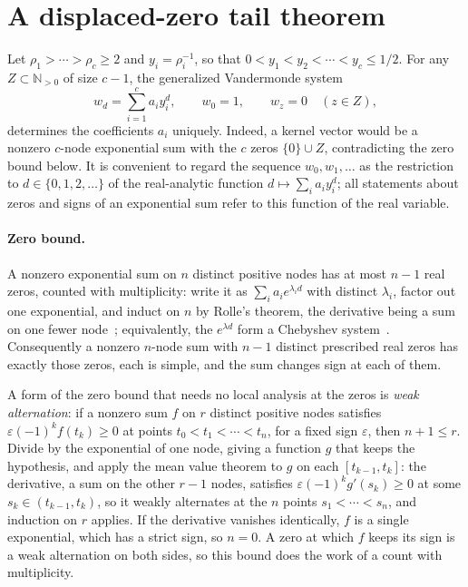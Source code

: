 \documentclass[11pt]{article}
\newcommand{\N}{\mathbb N}
\begin{document}
\section{A displaced-zero tail theorem}

Let $\rho_1>\cdots>\rho_c\ge2$ and $y_i=\rho_i^{-1}$, so that
$0<y_1<y_2<\cdots<y_c\le1/2$.  For any $Z\subset\N_{>0}$ of size $c-1$, the
generalized Vandermonde system
\[
  w_d=\sum_{i=1}^c a_i y_i^d,
  \qquad w_0=1,
  \qquad w_z=0\quad(z\in Z),
\]
determines the coefficients $a_i$ uniquely.  Indeed, a kernel vector would be
a nonzero $c$-node exponential sum with the $c$ zeros $\{0\}\cup Z$,
contradicting the zero bound below.  It is convenient to regard the sequence
$w_0,w_1,\ldots$ as the restriction to $d\in\{0,1,2,\ldots\}$ of the
real-analytic function $d\mapsto\sum_ia_iy_i^d$; all statements about zeros
and signs of an exponential sum refer to this function of the real variable.

\paragraph{Zero bound.}
A nonzero exponential sum on $n$ distinct positive nodes has at most $n-1$
real zeros, counted with multiplicity: write it as $\sum_ia_ie^{\lambda_id}$
with distinct $\lambda_i$, factor out one exponential, and induct on $n$ by
Rolle's theorem, the derivative being a sum on one fewer
node~\cite[Part~Five, Ch.~1]{polya-szego}; equivalently, the $e^{\lambda d}$
form a Chebyshev system~\cite{karlin}.
Consequently a nonzero $n$-node sum with $n-1$
distinct prescribed real zeros has exactly those zeros, each is simple, and the sum
changes sign at each of them.

A form of the zero bound that needs no local analysis at the zeros is
\emph{weak alternation}: if a nonzero sum $f$ on $r$ distinct positive nodes
satisfies $\varepsilon(-1)^kf(t_k)\ge0$ at points $t_0<t_1<\cdots<t_n$, for a
fixed sign $\varepsilon$, then $n+1\le r$.  Divide by the exponential of one
node, giving a function $g$ that keeps the hypothesis, and apply the mean
value theorem to $g$ on each $[t_{k-1},t_k]$: the derivative, a sum on the other $r-1$ nodes, satisfies
$\varepsilon(-1)^kg'(s_k)\ge0$ at some $s_k\in(t_{k-1},t_k)$, so it weakly
alternates at the $n$ points $s_1<\cdots<s_n$, and induction on $r$ applies.
If the derivative vanishes identically, $f$ is a single exponential, which has
a strict sign, so $n=0$.  A zero at which $f$ keeps its sign is a weak
alternation on both sides, so this bound does the work of a count with
multiplicity.
\end{document}
